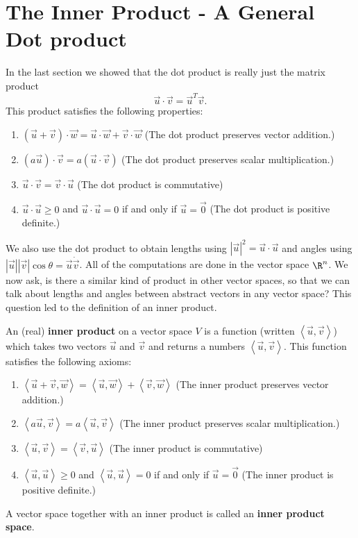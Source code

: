  
 
 
 
 
 
 
 
 
 
 
 
\section{The Inner Product - A General Dot product}
In the last section we showed that the dot product is really just the matrix product $$\vec u\cdot \vec v = \vec u^T\vec v.$$ 
This product satisfies the following properties:
\begin{enumerate}
\item $(\vec u +\vec v)\cdot \vec w = \vec u\cdot \vec w + \vec v\cdot \vec w$ (The dot product preserves vector addition.)
\item $(a\vec u)\cdot \vec v = a(\vec u\cdot \vec v)$ (The dot product preserves scalar multiplication.)
\item $\vec u\cdot \vec v = \vec v\cdot \vec u$ (The dot product is commutative) 
\item $\vec u\cdot \vec u \geq 0$ and $\vec u\cdot\vec u=0$ if and only if $\vec u =\vec 0$ (The dot product is positive definite.)
\end{enumerate}
We also use the dot product to obtain lengths using $|\vec u|^2 = \vec u\cdot \vec u$ and angles using $|\vec u||\vec v| \cos\theta = \vec u\dot \vec v$. All of the computations are done in the vector space $\R^n$. We now ask, is there a similar kind of product in other vector spaces, so that we can talk about lengths and angles between abstract vectors in any vector space? This question led to the definition of an inner product.




\begin{definition}
An (real) \textbf{inner product} on a vector space $V$ is a function (written $\left<\vec u,\vec v\right>$) which takes two vectors $\vec u$ and $\vec v$ and returns a numbers $\left<\vec u,\vec v\right>$. This function satisfies the following axioms:
\begin{enumerate}
\item $\left< \vec u +\vec v, \vec w\right> = \left<\vec u, \vec w \right> + \left< \vec v ,    \vec w \right>$ (The inner product preserves vector addition.)
\item $\left< a\vec u ,    \vec v \right>= a\left< \vec u ,    \vec v \right>$ (The inner product preserves scalar multiplication.)
\item $\left< \vec u ,    \vec v  \right> = \left< \vec v ,    \vec u \right>$ (The inner product is commutative) 
\item $\left< \vec u ,    \vec u \right> \geq 0$ and $\left< \vec u ,   \vec u \right>=0$ if and only if $\vec u =\vec 0$ (The inner product is positive definite.)
\end{enumerate}
A vector space together with an inner product is called an \textbf{inner product space}.
\end{definition}

